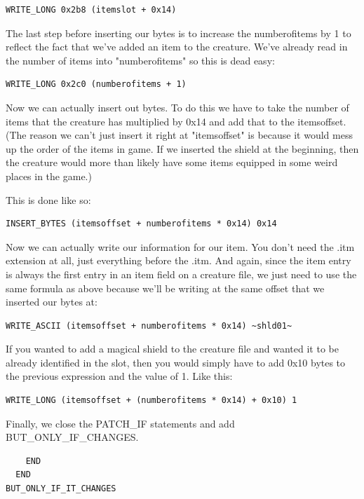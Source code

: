\documentclass{article}
\def\ttref#1{\ahrefloc{#1}{\tt #1}}
\begin{document}
\begin{verbatim}
WRITE_LONG 0x2b8 (itemslot + 0x14)
\end{verbatim}

The last step before inserting our bytes is to increase the numberofitems by 1 to
reflect the fact that we've added an item to the creature.  We've already
read in the number of items into "numberofitems" so this is dead easy:

\begin{verbatim}
WRITE_LONG 0x2c0 (numberofitems + 1)
\end{verbatim}

Now we can actually insert out bytes.  To do this we have to take the
number of items that the creature has multiplied by 0x14 and add that to
the itemsoffset.  (The reason we can't just insert it right at
"itemsoffset" is because it would mess up the order of the items in game.
If we inserted the shield at the beginning, then the creature would more
than likely have some items equipped in some weird places in the game.)

This is done like so:

\begin{verbatim}
INSERT_BYTES (itemsoffset + numberofitems * 0x14) 0x14
\end{verbatim}

Now we can actually write our information for our item.  You don't need the
.itm extension at all, just everything before the .itm.  And again, since
the item entry is always the first entry in an item field on a creature
file, we just need to use the same formula as above because we'll be
writing at the same offset that we inserted our bytes at:

\begin{verbatim}
WRITE_ASCII (itemsoffset + numberofitems * 0x14) ~shld01~
\end{verbatim}

If you wanted to add a magical shield to the creature file and wanted it to
be already identified in the slot, then you would simply have to add 0x10
bytes to the previous expression and \ttref{WRITE_LONG} the value of 1.
Like this:

\begin{verbatim}
WRITE_LONG (itemsoffset + (numberofitems * 0x14) + 0x10) 1
\end{verbatim}

Finally, we close the PATCH_IF statements and add BUT_ONLY_IF_CHANGES.

\begin{verbatim}
    END
  END
BUT_ONLY_IF_IT_CHANGES
\end{verbatim}
\end{document}
